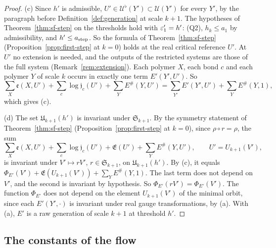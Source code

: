 \begin{proof}
(c) Since $h'$ is admissible, $U'\in\mathcal U^\flat(Y')\subset\mathcal U(Y')$ for every $Y'$, by the paragraph before Definition~\ref{def:generation} at scale $k+1$. The hypotheses of Theorem~\ref{thm:sf-step} on the thresholds hold with $\varepsilon'_1=h'$: (Q2), $h_k\le a_1$ by admissibility, and $h'\le a_{\rm step}$. So the formula of Theorem~\ref{thm:sf-step} (Proposition~\ref{prop:first-step} at $k=0$) holds at the real critical reference $U'$. At $U'$ no extension is needed, and the outputs of the restricted systems are those of the full system (Remark~\ref{rem:extension}). Each polymer $X$, each bond $c$ and each polymer $Y$ of scale $k$ occurs in exactly one term $E'(Y',U')$. So
\[
\sum_X\mathfrak e(X,U')+\sum_c\log\mathfrak j_c(U')+\sum_YE^\#(Y,U')=\sum_{Y'}E'(Y',U')+\sum_YE^\#(Y,1),
\]
which gives (c).

(d) The set $\mathfrak U_{k+1}(h')$ is invariant under $\mathfrak S_{k+1}$. By the symmetry statement of Theorem~\ref{thm:sf-step} (Proposition~\ref{prop:first-step} at $k=0$), since $\rho\circ r=\rho$, the sum
\[
\sum_X\mathfrak e(X,U')+\sum_c\log\mathfrak j_c(U')+\mathfrak E(U')+\sum_YE^\#(Y,U'),\qquad U'=U_{k+1}(V'),
\]
is invariant under $V'\mapsto rV'$, $r\in\mathfrak S_{k+1}$, on $\mathfrak U_{k+1}(h')$. By (c), it equals $\Phi_{E'}(V')+\mathfrak E(U_{k+1}(V'))+\sum_YE^\#(Y,1)$. The last term does not depend on $V'$, and the second is invariant by hypothesis. So $\Phi_{E'}(rV')=\Phi_{E'}(V')$. The function $\Phi_{E'}$ does not depend on the element $U_{k+1}(V')$ of the minimal orbit, since each $E'(Y',\cdot)$ is invariant under real gauge transformations, by (a). With (a), $E'$ is a raw generation of scale $k+1$ at threshold $h'$.
\end{proof}

\subsection{The constants of the flow}\label{subsec:flow4-constants}

